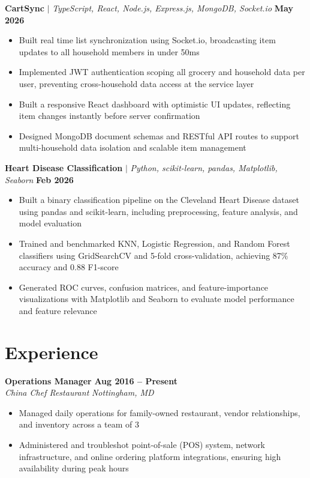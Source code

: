 \documentclass[11pt,letterpaper]{article}
\newcommand{\job}[4]{
    \noindent\textbf{#1} \hfill \textbf{#2}\\
    \textit{#3} \hfill \textit{#4}
}
\newcommand{\project}[3]{
    \noindent\textbf{#1} $\mid$ \textit{#2} \hfill \textbf{#3}
}
\begin{document}
\project{CartSync}{TypeScript, React, Node.js, Express.js, MongoDB, Socket.io}{May 2026}
\begin{itemize}
    \item Built real time list synchronization using Socket.io, broadcasting
    item updates to all household members in under 50ms
    \item Implemented JWT authentication scoping all grocery and household
    data per user, preventing cross-household data access at the service layer
    \item Built a responsive React dashboard with optimistic UI updates,
    reflecting item changes instantly before server confirmation
    \item Designed MongoDB document schemas and RESTful API routes to support
    multi-household data isolation and scalable item management
\end{itemize}

\project{Heart Disease Classification}{Python, scikit-learn, pandas, Matplotlib, Seaborn}{Feb 2026}
\begin{itemize}
    \item Built a binary classification pipeline on the Cleveland Heart Disease dataset using pandas and scikit-learn, including preprocessing, feature analysis, and model evaluation
    \item Trained and benchmarked KNN, Logistic Regression, and Random Forest classifiers using GridSearchCV and 5-fold cross-validation, achieving 87\% accuracy and 0.88 F1-score
    \item Generated ROC curves, confusion matrices, and feature-importance visualizations with Matplotlib and Seaborn to evaluate model performance and feature relevance
\end{itemize}

\section{Experience}

\job{Operations Manager}{Aug 2016 -- Present}{China Chef Restaurant}{Nottingham, MD}
\begin{itemize}
    \item Managed daily operations for family-owned restaurant, vendor relationships, and inventory across a team of 3
    \item Administered and troubleshot point-of-sale (POS) system, network infrastructure, and online ordering platform integrations, ensuring high availability during peak hours
\end{itemize}
\end{document}
